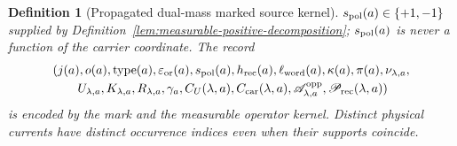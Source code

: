 \documentclass[11pt]{article}
\newtheorem{definition}[theorem]{Definition}
\begin{document}
\begin{definition}[Propagated dual-mass marked source kernel]
$s_{\rm pol}(a)\in\{+1,-1\}$ supplied by
Definition~\ref{lem:measurable-positive-decomposition}; $s_{\rm pol}(a)$ is never a
function of the carrier coordinate.
The record
\begin{equation}
\label{eq:source-incidence-record}
\begin{aligned}
 &(j(a),o(a),\operatorname{type}(a),\varepsilon_{\rm or}(a),
   s_{\rm pol}(a),h_{\rm rec}(a),\ell_{\rm word}(a),
   \kappa(a),\pi(a),\nu_{\lambda,a},\\
 &\qquad U_{\lambda,a},K_{\lambda,a},R_{\lambda,a},\gamma_a,
   C_U(\lambda,a),C_{\rm car}(\lambda,a),
   \mathscr A_{\lambda,a}^{\rm opp},\mathscr P_{\rm rec}(\lambda,a))
\end{aligned}
\end{equation}
is encoded by the mark and the measurable operator kernel.  Distinct
physical currents have distinct occurrence indices even when their supports
coincide.


\end{definition}
\end{document}

